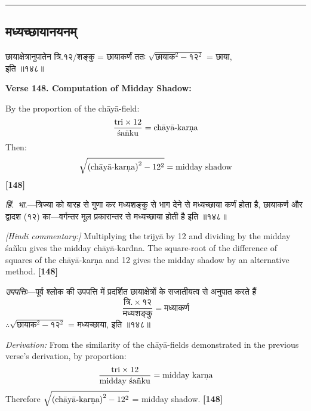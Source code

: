 \documentclass[11pt,a4paper]{article}
\newcommand{\longline}{\noindent\rule{\textwidth}{0.4pt}}
\newcommand{\dev}[1]{{\devanagarifont #1}}
\newcommand{\sectsep}{\par\vspace{0.8em}\longline\vspace{0.8em}}
\begin{document}
\sectsep

\subsection{\dev{मध्यच्छायानयनम्}}

\begin{minipage}[t]{0.48\textwidth}
\small\devanagarifont
छायाक्षेत्रानुपातेन त्रि.१२/शङ्कु = छायाकर्णं ततः $\sqrt{\text{छायाक}^2 - १२^2}$ = छाया,\\
इति ॥१४८॥
\end{minipage}%
\hfill
\begin{minipage}[t]{0.48\textwidth}
\small
\textbf{Verse 148. Computation of Midday Shadow:}

By the proportion of the ch\=ay\=a-field:
\[
\frac{\text{tri} \times 12}{\text{\'sa\~nku}} = \text{ch\=ay\=a-kar\d{n}a}
\]
Then:
\[
\sqrt{\text{(ch\=ay\=a-kar\d{n}a)}^2 - 12^2} = \text{midday shadow}
\]
\hfill \textbf{[148]}
\end{minipage}

\vspace{0.5em}
\begin{minipage}[t]{0.48\textwidth}
\small\devanagarifont
\textit{हिं.~भा.}---त्रिज्या को बारह से गुणा कर मध्यशङ्कु से भाग देने से मध्यच्छाया कर्णं होता है, छायाकर्ण और द्वादश (१२) का---वर्गन्तर मूल प्रकारान्तर से मध्यच्छाया होती है इति ॥१४८॥
\end{minipage}%
\hfill
\begin{minipage}[t]{0.48\textwidth}
\small
\textit{[Hindi commentary:]} Multiplying the trijy\=a by 12 and dividing by the midday \'sa\~nku gives the midday ch\=ay\=a-kar\=d{n}a. The square-root of the difference of squares of the ch\=ay\=a-kar\d{n}a and 12 gives the midday shadow by an alternative method. \hfill\textbf{[148]}
\end{minipage}

\vspace{0.5em}
\begin{minipage}[t]{0.48\textwidth}
\small\devanagarifont
\textit{उपपत्तिः}---पूर्व श्लोक की उपपत्ति में प्रदर्शित छायाक्षेत्रों के सजातीयत्व से अनुपात करते हैं
\[
\frac{\text{त्रि.} \times १२}{\text{मध्यशङ्कु}} = \text{मध्याकर्ण}
\]
$\therefore \sqrt{\text{छायाक}^2 - १२^2}$ = मध्यच्छाया, इति ॥१४८॥
\end{minipage}%
\hfill
\begin{minipage}[t]{0.48\textwidth}
\small
\textit{Derivation:} From the similarity of the ch\=ay\=a-fields demonstrated in the previous verse's derivation, by proportion:
\[
\frac{\text{tri} \times 12}{\text{midday \'sa\~nku}} = \text{midday kar\d{n}a}
\]
Therefore $\sqrt{\text{(ch\=ay\=a-kar\d{n}a)}^2 - 12^2}$ = midday shadow. \hfill\textbf{[148]}
\end{minipage}
\end{document}
